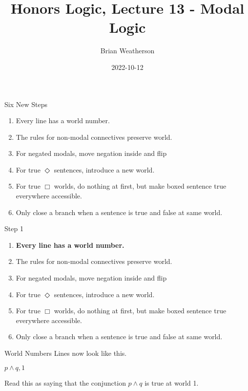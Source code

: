 \documentclass[
  14pt,
  letterpaper,
  ignorenonframetext,
  aspectratio=169,
  handout]{beamer}
\title{Honors Logic, Lecture 13 - Modal Logic}
\author{Brian Weatherson}
\date{2022-10-12}
\providecommand{\tightlist}{%
  \setlength{\itemsep}{0pt}\setlength{\parskip}{0pt}}\usepackage{longtable,booktabs,array}
\begin{document}
\frame{\titlepage}
\ifdefined\Shaded\renewenvironment{Shaded}{\begin{tcolorbox}[borderline west={3pt}{0pt}{shadecolor}, enhanced, boxrule=0pt, interior hidden, frame hidden, sharp corners, breakable]}{\end{tcolorbox}}\fi

\begin{frame}{Six New Steps}
\protect\hypertarget{six-new-steps}{}
\begin{enumerate}
\tightlist
\item
  Every line has a world number.
\item
  The rules for non-modal connectives preserve world.
\item
  For negated modals, move negation inside and flip
\item
  For true \(\Diamond\) sentences, introduce a new world.
\item
  For true \(\Box\) worlds, do nothing at first, but make boxed sentence
  true everywhere accessible.
\item
  Only close a branch when a sentence is true and false at same world.
\end{enumerate}
\end{frame}

\begin{frame}{Step 1}
\protect\hypertarget{step-1}{}
\begin{enumerate}
\tightlist
\item
  \textbf{Every line has a world number.}
\item
  The rules for non-modal connectives preserve world.
\item
  For negated modals, move negation inside and flip
\item
  For true \(\Diamond\) sentences, introduce a new world.
\item
  For true \(\Box\) worlds, do nothing at first, but make boxed sentence
  true everywhere accessible.
\item
  Only close a branch when a sentence is true and false at same world.
\end{enumerate}
\end{frame}

\begin{frame}{World Numbers}
\protect\hypertarget{world-numbers}{}
Lines now look like this.

\begin{center}
$p \wedge q, 1$
\end{center}

Read this as saying that the conjunction \(p \wedge q\) is true at world
1.
\end{frame}
\end{document}
